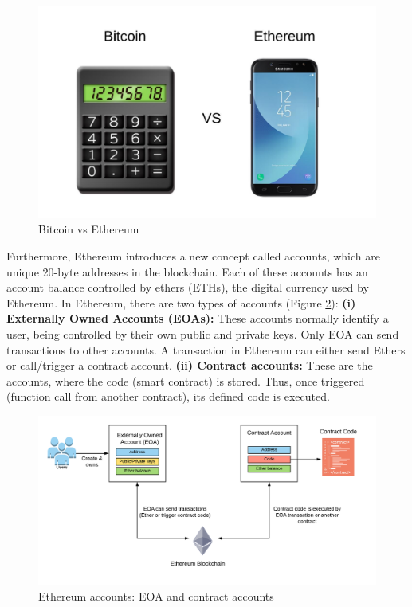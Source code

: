 \begin{figure}
  \centering
  	\includegraphics[scale=0.8]{gfx/bitcoinVSEthereum.jpeg}
  \caption{Bitcoin vs Ethereum}
  \label{fig:BitcoinEthereum}
\end{figure}

Furthermore, Ethereum introduces a new concept called accounts, which are unique 20-byte addresses in the blockchain. Each of these accounts has an account balance controlled by ethers (ETHs), the digital currency used by Ethereum. In Ethereum, there are two types of accounts (Figure \ref{fig:EthereumAccounts}): \newline
\textbf{(i) Externally Owned Accounts (EOAs):} These accounts normally identify a user, being controlled by their own public and private keys. Only EOA can send transactions to other accounts. A transaction in Ethereum can either send Ethers or call/trigger a contract account. \newline
\textbf{(ii) Contract accounts:} These are the accounts, where the code (smart contract) is stored. Thus, once triggered (function call from another contract), its defined code is executed.

\begin{figure}
  \centering
  	\includegraphics[scale=0.7]{gfx/ethereumAccounts.png}
  \caption{Ethereum accounts: EOA and contract accounts}
  \label{fig:EthereumAccounts}
\end{figure}

